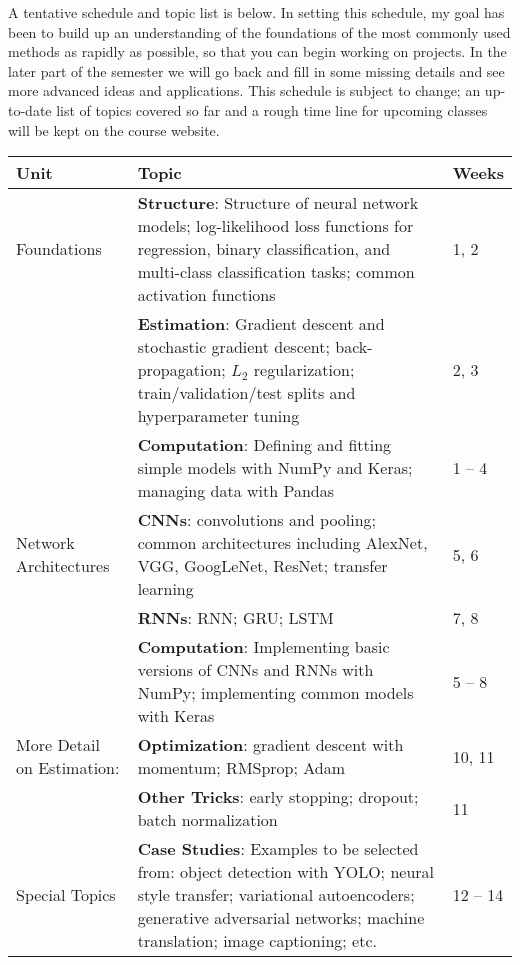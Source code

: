 \documentclass[11pt]{article}
\begin{document}
A tentative schedule and topic list is below.  In setting this schedule, my goal has been to build up an understanding of the foundations of the most commonly used methods as rapidly as possible, so that you can begin working on projects.  In the later part of the semester we will go back and fill in some missing details and see more advanced ideas and applications.  This schedule is subject to change; an up-to-date list of topics covered so far and a rough time line for upcoming classes will be kept on the course website.

\begin{table}[!h]
\begin{tabular}{p{2.45cm} p{11cm} l}
\toprule
Unit & Topic & Weeks \\
\midrule
Foundations & \textbf{Structure}: Structure of neural network models; log-likelihood loss functions for regression, binary classification, and multi-class classification tasks; common activation functions & 1, 2 \\
\cmidrule(r){2-3}
 & \textbf{Estimation}: Gradient descent and stochastic gradient descent; back-propagation; $L_2$ regularization; train/validation/test splits and hyperparameter tuning & 2, 3 \\
\cmidrule(r){2-3}
 & \textbf{Computation}: Defining and fitting simple models with NumPy and Keras; managing data with Pandas & 1 -- 4 \\
\midrule
Network Architectures & \textbf{CNNs}: convolutions and pooling; common architectures including AlexNet, VGG, GoogLeNet, ResNet; transfer learning & 5, 6 \\
\cmidrule(r){2-3}
 & \textbf{RNNs}: RNN; GRU; LSTM & 7, 8 \\
\cmidrule(r){2-3}
 & \textbf{Computation}: Implementing basic versions of CNNs and RNNs with NumPy; implementing common models with Keras & 5 -- 8 \\
\midrule
More Detail on Estimation: & \textbf{Optimization}: gradient descent with momentum; RMSprop; Adam & 10, 11 \\
\cmidrule(r){2-3}
 & \textbf{Other Tricks}: early stopping; dropout; batch normalization & 11 \\
\midrule
Special Topics & \textbf{Case Studies}: Examples to be selected from: object detection with YOLO; neural style transfer; variational autoencoders; generative adversarial networks; machine translation; image captioning; etc. & 12 -- 14 \\
\bottomrule
\end{tabular}
\end{table}
\end{document}
